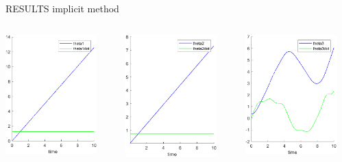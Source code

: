 \documentclass{beamer}              %
\begin{document}
	\begin{frame}{RESULTS implicit method}		
		\begin{columns}
			\begin{column}{0.33\textwidth}
			  	\includegraphics[width=100pt]{grafici/matlabNorm1.png}
			\end{column}
		    \begin{column}{0.33\textwidth}
		    	\includegraphics[width=100pt]{grafici/matlabNorm2.png}
		    \end{column}
		    \begin{column}{0.33\textwidth}
				\includegraphics[width=100pt]{grafici/matlabNorm3.png}
		    \end{column}
		\end{columns}
	\end{frame}		
\end{document}
